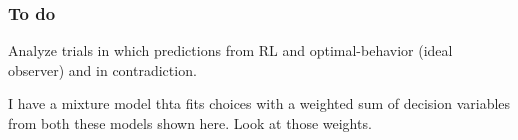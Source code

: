 \subsubsection*{To do}
Analyze trials in which predictions from RL and optimal-behavior (ideal observer) and in contradiction.

I have a mixture model thta fits choices with a weighted sum of decision variables from both these models shown here. Look at those weights.











